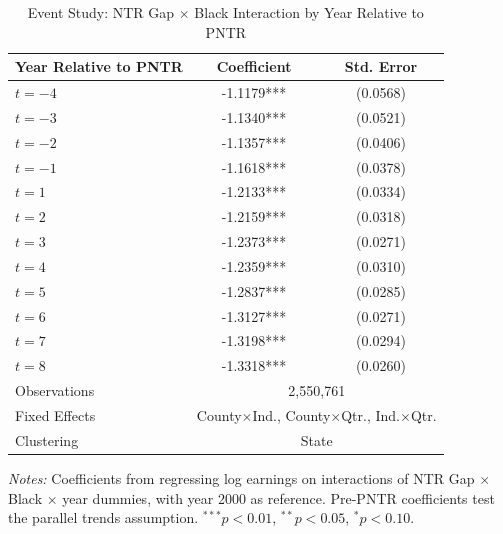 \begin{table}[htbp]
\centering
\caption{Event Study: NTR Gap $\times$ Black Interaction by Year Relative to PNTR}
\label{tab:event_study}
\small
\begin{tabular}{lcc}
\toprule
Year Relative to PNTR & Coefficient & Std. Error \\
\midrule
$t = -4$ & -1.1179*** & (0.0568) \\
$t = -3$ & -1.1340*** & (0.0521) \\
$t = -2$ & -1.1357*** & (0.0406) \\
$t = -1$ & -1.1618*** & (0.0378) \\
$t = 1$ & -1.2133*** & (0.0334) \\
$t = 2$ & -1.2159*** & (0.0318) \\
$t = 3$ & -1.2373*** & (0.0271) \\
$t = 4$ & -1.2359*** & (0.0310) \\
$t = 5$ & -1.2837*** & (0.0285) \\
$t = 6$ & -1.3127*** & (0.0271) \\
$t = 7$ & -1.3198*** & (0.0294) \\
$t = 8$ & -1.3318*** & (0.0260) \\
\midrule
Observations & \multicolumn{2}{c}{2,550,761} \\
Fixed Effects & \multicolumn{2}{c}{County$\times$Ind., County$\times$Qtr., Ind.$\times$Qtr.} \\
Clustering & \multicolumn{2}{c}{State} \\
\bottomrule
\end{tabular}
\begin{tablenotes}
\item \textit{Notes:} Coefficients from regressing log earnings on interactions of NTR Gap $\times$ Black $\times$ year dummies, with year 2000 as reference. Pre-PNTR coefficients test the parallel trends assumption. $^{***}p<0.01$, $^{**}p<0.05$, $^{*}p<0.10$.
\end{tablenotes}
\end{table}
